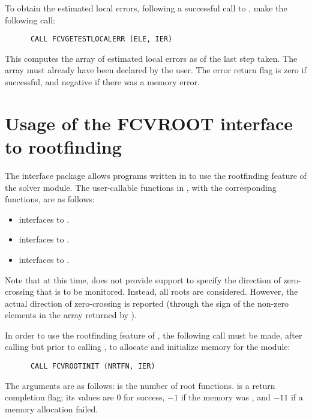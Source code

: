 To obtain the estimated local errors, following a successful call to
, make the following call:
\begin{verbatim}
      CALL FCVGETESTLOCALERR (ELE, IER)
\end{verbatim}
This computes the  array of estimated local errors as of the last
step taken.  The array  must already have been declared by the user.
The error return flag  is zero if successful, and negative if there
was a memory error.


\section{Usage of the FCVROOT interface to rootfinding}

The {\fcvroot} interface package allows programs written in {\F} to
use the rootfinding feature of the {\cvode} solver module.
The user-callable functions in {\fcvroot}, with the corresponding
{\cvode} functions, are as follows: 
\begin{itemize}
  \item {} interfaces to .
  \item {} interfaces to .
  \item {} interfaces to .
\end{itemize}
Note that at this time, {\fcvroot} does not provide support to
specify the direction of zero-crossing that is to be monitored. 
Instead, all roots are considered. However, the actual direction
of zero-crossing is reported (through the sign of the non-zero
elements in the array  returned by ).

In order to use the rootfinding feature of {\cvode}, the following
call must be made, after calling  but prior to calling
, to allocate and initialize memory for the  module:
\begin{verbatim}
      CALL FCVROOTINIT (NRTFN, IER)
\end{verbatim}
The arguments are as follows:
 is the number of root functions.
 is a return completion flag; its values are $0$ for success, $-1$ 
if the  memory was , and $-11$ if a memory allocation failed.

